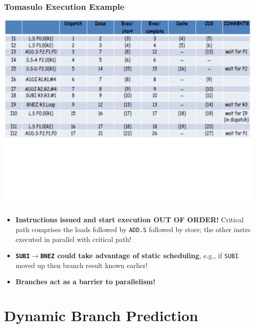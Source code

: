 \documentclass{beamer}
\newcommand{\emp}[1]{\textcolor{DikuRed}{ #1}}
\newcommand{\emphh}[1]{\textcolor{CosGreen}{ #1}}
\begin{document}
\begin{frame}[fragile,t]
\frametitle{Tomasulo Execution Example}

\includegraphics[width=64ex]{FigsOoOProc/TomasuloEg.pdf}
\vspace{-19ex}

\begin{itemize}
    \item \emphh{\bf Instructions issued and start execution OUT OF ORDER!}
            Critical path\pause {\tt~} comprises the loads followed by {\tt ADD.S}
            followed by store; the other instrs executed in parallel with critical path! 
    \item \emp{\bf {\tt SUBI$\rightarrow$BNEZ} could take advantage of static scheduling}\pause, 
                e.g., if {\tt SUBI} moved up then branch result 
                known earlier!
    \item \alert{\bf Branches act as a barrier to parallelism!} 
\end{itemize}
\end{frame}

\section{Dynamic Branch Prediction}

\begin{frame}[fragile]
	\tableofcontents[currentsection]
\end{frame}
\end{document}
